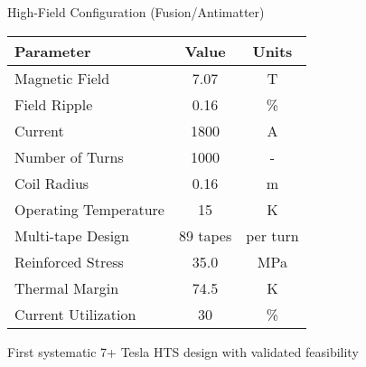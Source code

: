 \begin{frame}{High-Field Configuration (Fusion/Antimatter)}
    \begin{table}[h]
        \centering
        \begin{tabular}{lcc}
            \toprule
            \textbf{Parameter} & \textbf{Value} & \textbf{Units} \\
            \midrule
            Magnetic Field & 7.07 & T \\
            Field Ripple & 0.16 & \% \\
            Current & 1800 & A \\
            Number of Turns & 1000 & - \\
            Coil Radius & 0.16 & m \\
            Operating Temperature & 15 & K \\
            Multi-tape Design & 89 tapes & per turn \\
            Reinforced Stress & 35.0 & MPa \\
            Thermal Margin & 74.5 & K \\
            Current Utilization & 30 & \% \\
            \bottomrule
        \end{tabular}
    \end{table}
    
     First systematic 7+ Tesla HTS design with validated feasibility
\end{frame}

